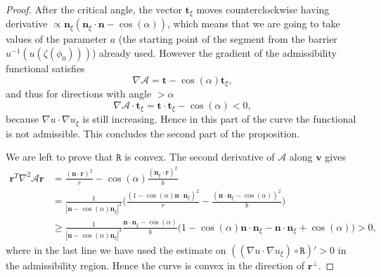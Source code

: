\documentclass[reqno]{amsart}
\theoremstyle{definition} \newtheorem{definition}{Definition}[section]
\theoremstyle{definition} \newtheorem{remark}[definition]{Remark}
\theoremstyle{plain} \newtheorem{lemma}[definition]{Lemma}
\theoremstyle{plain} \newtheorem{proposition}[definition]{Proposition}
\theoremstyle{plain} \newtheorem{theorem}[definition]{Theorem}
\theoremstyle{plain} \newtheorem{corollary}[definition]{Corollary}
\theoremstyle{definition} \newtheorem{example}[definition]{Example}
\theoremstyle{plain} \newtheorem{claim}[clai]{Claim}
\theoremstyle{definition} \newtheorem{assumption}[definition]{Assumption}
\theoremstyle{definition} \newtheorem{observation}[definition]{Observation}
\newcommand{\n}{\mathbf n}
\newcommand{\1}{\mathbbm 1}
\numberwithin{equation}{section} %
\theoremstyle{plain} \newtheorem*{theorem*}{Theorem}
\theoremstyle{plain} \newtheorem{mthm}[maintheorem]{Main Theorem}
\theoremstyle{plain} \newtheorem*{mthm*}{Main Theorem}
\theoremstyle{plain} \newtheorem*{conjecture*}{Conjecture}
\theoremstyle{plain} \newtheorem{conjecture}[definition]{Conjecture}
\theoremstyle{plain} \newtheorem*{problem*}{Problem}
\begin{document}
\begin{proof}
After the critical angle, the vector $\mathbf t_\xi$ moves counterclockwise having derivative $\propto \n_\xi (\n_\xi \cdot \n - \cos(\alpha))$, which means that we are going to take values of the parameter $a$ (the starting point of the segment from the barrier $u^{-1}(u(\zeta({\phi_0})))$) already used. 
However the gradient of the admissibility functional satisfies
\begin{equation*}
\nabla \mathcal A = \mathbf t - \cos( \alpha) \mathbf t_\xi,
\end{equation*}
and thus for directions with angle $> \alpha$
\begin{equation*}
\nabla \mathcal A \cdot \mathbf t_\xi = \mathbf t \cdot \mathbf t_\xi - \cos(\alpha) < 0,
\end{equation*}
because $\nabla u \cdot \nabla u_\xi$ is still increasing. Hence in this part of the curve the functional is not admissible. This concludes the second part of the proposition.

We are left to prove that $\mathtt R$ is convex. The second derivative of $\mathcal A$ along $\mathbf v$ gives
\begin{equation*}
\begin{split}
\mathbf r^T \nabla^2 \mathcal A \mathbf r &= \frac{(\mathbf n \cdot \mathbf r)^2}{r} - \cos(\alpha) \frac{(\mathbf n_\xi \cdot \mathbf r)^2}{b} \\
&= \frac{1}{|\mathbf n - \cos(\alpha) \mathbf n_\xi|^2} \bigg( \frac{(1 - \cos(\alpha) \mathbf n \cdot \mathbf n_\xi)^2}{r} - \frac{(\mathbf n \cdot \mathbf n_\xi - \cos(\alpha))^2}{b} \bigg) \\
&\geq \frac{1}{|\mathbf n - \cos(\alpha) \mathbf n_\xi|^2} \frac{\mathbf n \cdot \mathbf n_\xi - \cos(\alpha)}{b} \big( 1 - \cos(\alpha) \mathbf n \cdot \mathbf n_\xi - \mathbf n \cdot \mathbf n_\xi + \cos(\alpha) \big) > 0,
\end{split}
\end{equation*}
where in the last line we have used the estimate on $((\nabla u \cdot \nabla u_\xi) \circ \mathtt R)' > 0$ in the admissibility region. Hence the curve is convex in the direction of $\mathbf r^\perp$.
\end{proof}
\end{document}

